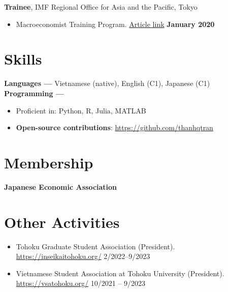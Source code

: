 \documentclass[margin,line]{res}
\begin{document}
\begin{resume}
\vspace*{.05in}
{\bf Trainee}, IMF Regional Office for Asia and the Pacific, Tokyo
\vspace*{.05in}
\begin{itemize}
\item[ ] Macroeconomist Training Program. \href{https://www.imf.org/en/Countries/ResRep/OAP-Home/~/link.aspx?_id=C2F64E8412B64A86BD37DDEB8439312B&_z=z}{Article link} \hfill {\bf January 2020}
\end{itemize}

\vspace{4mm}

\section{\sc Skills}
{\bf Languages ---}
\vspace*{.05in}
Vietnamese (native), English (C1), Japanese (C1)\\
{\bf Programming ---}
\vspace*{.05in}
\begin{itemize}
	\item Proficient in: Python, R, Julia, MATLAB
	\item {\bf Open-source contributions}: \url{https://github.com/thanhqtran}
\end{itemize}

\vspace{4mm}

\section{\sc Membership}
{\bf Japanese Economic Association} \\








\section{\sc Other Activities}
\begin{itemize}
\item[] Tohoku Graduate Student Association (President). \url{https://inseikaitohoku.org/} \hfill 2/2022--9/2023
\item[] Vietnamese Student Association at Tohoku University (President). \url{https://vsatohoku.org/} \hfill 10/2021 -- 9/2023	
\end{itemize}


\end{resume}
\end{document}
